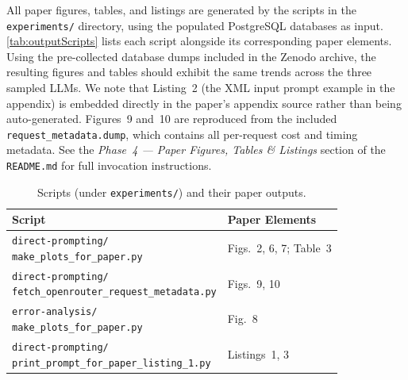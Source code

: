 \artout
All paper figures, tables, and listings are generated by the scripts in the \texttt{experiments/} directory, using the populated PostgreSQL databases as input.
\autoref{tab:outputScripts} lists each script alongside its corresponding paper elements.
Using the pre-collected database dumps included in the Zenodo archive, the resulting figures and tables should exhibit the same trends across the three sampled LLMs.
We note that Listing~2 (the XML input prompt example in the appendix) is embedded directly in the paper's appendix source rather than being auto-generated.
Figures~9 and~10 are reproduced from the included \texttt{request\_metadata.dump}, which contains all per-request cost and timing metadata.
See the \textit{Phase~4 --- Paper Figures, Tables \& Listings} section of the \texttt{README.md} for full invocation instructions.

\begin{table}
\centering
\caption{Scripts (under \texttt{experiments/}) and their paper outputs.}
\label{tab:outputScripts}
\scriptsize
\begin{tabular}{@{}ll@{}}
\toprule
Script & Paper Elements \\
\midrule
\shortstack[l]{\texttt{direct-prompting/}\\\texttt{make\_plots\_for\_paper.py}}                & Figs.\ 2, 6, 7; Table~3 \\[4pt]
\shortstack[l]{\texttt{direct-prompting/}\\\texttt{fetch\_openrouter\_request\_metadata.py}}   & Figs.\ 9, 10 \\[4pt]
\shortstack[l]{\texttt{error-analysis/}\\\texttt{make\_plots\_for\_paper.py}}                  & Fig.\ 8 \\[4pt]
\shortstack[l]{\texttt{direct-prompting/}\\\texttt{print\_prompt\_for\_paper\_listing\_1.py}}  & Listings~1, 3 \\
\bottomrule
\end{tabular}
\end{table}





























